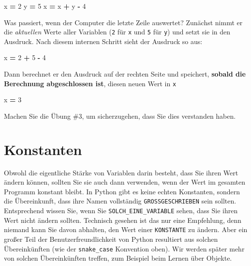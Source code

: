 \documentclass[
]{book}
\newenvironment{Shaded}{\begin{snugshade}}{\end{snugshade}}
\newcommand{\DecValTok}[1]{\textcolor[rgb]{0.00,0.00,0.81}{#1}}
\newcommand{\NormalTok}[1]{#1}
\newcommand{\OperatorTok}[1]{\textcolor[rgb]{0.81,0.36,0.00}{\textbf{#1}}}
\begin{document}
\begin{Shaded}
\begin{Highlighting}[]
\NormalTok{x }\OperatorTok{=} \DecValTok{2}
\NormalTok{y }\OperatorTok{=} \DecValTok{5}
\NormalTok{x }\OperatorTok{=}\NormalTok{ x }\OperatorTok{+}\NormalTok{ y }\OperatorTok{{-}} \DecValTok{4}
\end{Highlighting}
\end{Shaded}

Was passiert, wenn der Computer die letzte Zeile auswertet? Zunächst nimmt er die \emph{aktuellen} Werte aller Variablen (\texttt{2} für \texttt{x} und \texttt{5} für \texttt{y}) und setzt sie in den Ausdruck. Nach diesem internen Schritt sieht der Ausdruck so aus:

\begin{Shaded}
\begin{Highlighting}[]
\NormalTok{x }\OperatorTok{=} \DecValTok{2} \OperatorTok{+} \DecValTok{5} \OperatorTok{{-}} \DecValTok{4}
\end{Highlighting}
\end{Shaded}

Dann berechnet er den Ausdruck auf der rechten Seite und speichert, \textbf{sobald die Berechnung abgeschlossen ist}, diesen neuen Wert in \texttt{x}

\begin{Shaded}
\begin{Highlighting}[]
\NormalTok{x }\OperatorTok{=} \DecValTok{3}
\end{Highlighting}
\end{Shaded}

Machen Sie die Übung \#3, um sicherzugehen, dass Sie dies verstanden haben.

\hypertarget{constants}{%
\section{Konstanten}\label{constants}}

Obwohl die eigentliche Stärke von Variablen darin besteht, dass Sie ihren Wert ändern können, sollten Sie sie auch dann verwenden, wenn der Wert im gesamten Programm konstant bleibt. In Python gibt es keine echten Konstanten, sondern die Übereinkunft, dass ihre Namen vollständig \texttt{GROSSGESCHRIEBEN} sein sollten. Entsprechend wissen Sie, wenn Sie \texttt{SOLCH\_EINE\_VARIABLE} sehen, dass Sie ihren Wert nicht ändern sollten. Technisch gesehen ist das nur eine Empfehlung, denn niemand kann Sie davon abhalten, den Wert einer \texttt{KONSTANTE} zu ändern. Aber ein großer Teil der Benutzerfreundlichkeit von Python resultiert aus solchen Übereinkünften (wie der \texttt{snake\_case} Konvention oben). Wir werden später mehr von solchen Übereinkünften treffen, zum Beispiel beim Lernen über Objekte.
\end{document}
